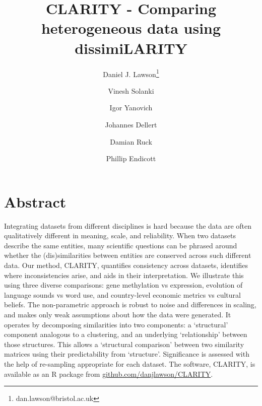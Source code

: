 \documentclass[a4]{article}
\newcommand{\+}[1]{\mathbf{#1}}
\begin{document}
\title{CLARITY - Comparing heterogeneous data using dissimiLARITY} 
\author[1,2]{Daniel J. Lawson\thanks{dan.lawson@bristol.ac.uk}}
\author[ ]{Vinesh Solanki}
\author[3]{Igor Yanovich}
\author[3]{Johannes Dellert}
\author[4]{Damian Ruck}
\author[5]{Phillip Endicott}


\maketitle

\section*{Abstract}
Integrating datasets from different disciplines is hard because the data are often qualitatively different in meaning, scale, and reliability. When two datasets describe the same entities, many scientific questions can be phrased around whether the (dis)similarities between entities are conserved  across such different data. Our method, CLARITY, quantifies consistency across datasets, identifies where inconsistencies arise, and aids in their interpretation. We illustrate this using three diverse comparisons: gene methylation vs expression, evolution of language sounds vs word use, and country-level economic metrics vs cultural beliefs.  The non-parametric approach is robust to noise and differences in scaling, and makes only weak assumptions about how the data were generated. It operates by decomposing similarities into two components: a `structural' component analogous to a clustering, and an underlying `relationship' between those structures. This allows a `structural comparison' between two similarity matrices using their predictability from `structure'. Significance is assessed with the help of re-sampling appropriate for each dataset. The software, CLARITY, is available as an R package from \href{https://github.com/danjlawson/CLARITY}{github.com/danjlawson/CLARITY}.
\end{document}
